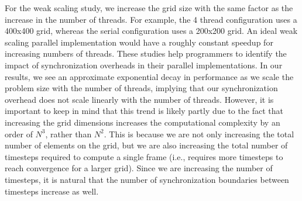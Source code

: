 For the weak scaling study, we increase the grid size with the same
factor as the increase in the number of threads. For example, the 4
thread configuration uses a 400x400 grid, whereas the serial
configuration uses a 200x200 grid. An ideal weak scaling parallel
implementation would have a roughly constant speedup for increasing
numbers of threads. These studies help programmers to identify the impact
of synchronization overheads in their parallel implementations. In our
results, we see an approximate exponential decay in performance as we
scale the problem size with the number of threads, implying that our
synchronization overhead does not scale linearly with the number of
threads. However, it is important to keep in mind that this trend is
likely partly due to the fact that increasing the grid dimensions
increases the computational complexity by an order of $N^3$, rather than
$N^2$. This is because we are not only increasing the total number of
elements on the grid, but we are also increasing the total number of
timesteps required to compute a single frame (i.e., requires more
timesteps to reach convergence for a larger grid). Since we are
increasing the number of timesteps, it is natural that the number of
synchronization boundaries between timesteps increase as well.